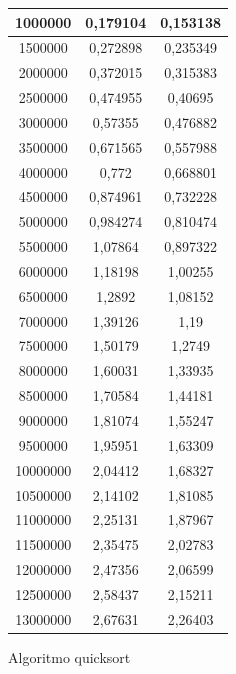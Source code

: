 \documentclass[12pt,spanish]{article}
\begin{document}
\begin{figure}[H]
\begin{tabular}{|c|c|c|}
\hline
1000000 & 0,179104 & 0,153138 \\
\hline
1500000 & 0,272898 & 0,235349 \\
\hline
2000000 & 0,372015 & 0,315383 \\
\hline
2500000 & 0,474955 & 0,40695 \\
\hline
3000000 & 0,57355 & 0,476882 \\
\hline
3500000 & 0,671565 & 0,557988 \\
\hline
4000000 & 0,772 & 0,668801 \\
\hline
4500000 & 0,874961 & 0,732228 \\
\hline
5000000 & 0,984274 & 0,810474 \\
\hline
5500000 & 1,07864 & 0,897322 \\
\hline
6000000 & 1,18198 & 1,00255 \\
\hline
6500000 & 1,2892 & 1,08152 \\
\hline
7000000 & 1,39126 & 1,19 \\
\hline
7500000 & 1,50179 & 1,2749 \\
\hline
8000000 & 1,60031 & 1,33935 \\
\hline
8500000 & 1,70584 & 1,44181 \\
\hline
9000000 & 1,81074 & 1,55247 \\
\hline
9500000 & 1,95951 & 1,63309 \\
\hline
10000000 & 2,04412 & 1,68327 \\
\hline
10500000 & 2,14102 & 1,81085 \\
\hline
11000000 & 2,25131 & 1,87967 \\
\hline
11500000 & 2,35475 & 2,02783 \\
\hline
12000000 & 2,47356 & 2,06599 \\
\hline
12500000 & 2,58437 & 2,15211 \\
\hline
13000000 & 2,67631 & 2,26403 \\
\hline
\end{tabular}
\caption{Algoritmo quicksort}
\end{figure}
\end{document}
